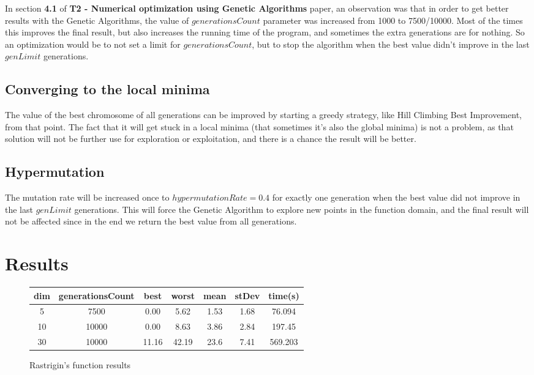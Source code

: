 \documentclass[a4paper]{article}
\begin{document}
	In section \textbf{4.1} of \textbf{T2 - Numerical optimization using Genetic Algorithms} paper, an observation was that in order to get better results with the Genetic Algorithms, the value of $generationsCount$ parameter was increased from 1000 to 7500/10000. Most of the times this improves the final result, but also increases the running time of the program, and sometimes the extra generations are for nothing. So an optimization would be to not set a limit for $generationsCount$, but to stop the algorithm when the best value didn't improve in the last $genLimit$ generations.
	
	\subsection{Converging to the local minima}
	
	The value of the best chromosome of all generations can be improved by starting a greedy strategy, like Hill Climbing Best Improvement, from that point. The fact that it will get stuck in a local minima (that sometimes it's also the global minima) is not a problem, as that solution will not be further use for exploration or exploitation, and there is a chance the result will be better.
	
	\subsection{Hypermutation}
	
	The mutation rate will be increased once to $hypermutationRate = 0.4$ for exactly one generation when the best value did not improve in the last $genLimit$ generations. This will force the Genetic Algorithm to explore new points in the function domain, and the final result will not be affected since in the end we return the best value from all generations. 
	
	\section{Results}
	
	\begin{figure}[!h]
		\centering
		\begin{tabular}{|| c | c | c | c | c | c | c ||}
			\hline
			dim & generationsCount & best & worst & mean & stDev & time(s) \\ \hline \hline
			5 & 7500 & 0.00 & 5.62 & 1.53 & 1.68 & 76.094 \\ \hline
			10 & 10000 & 0.00 & 8.63 & 3.86 & 2.84 & 197.45 \\ \hline
			30 & 10000 & 11.16 & 42.19 & 23.6 & 7.41 & 569.203 \\ \hline
		\end{tabular}
		\caption{Rastrigin's function results}
	\end{figure}
	
\end{document}
